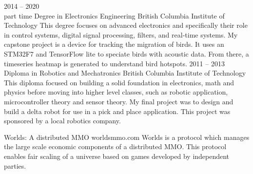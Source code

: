 \documentclass[9pt]{developercv} %
\begin{document}
\begin{entrylist}
	\entry
		{2014 -- 2020\\ \footnotesize{part time}}
		{Degree in Electronics Engineering}
		{British Columbia Institute of Technology}
		{This degree focuses on advanced electronics and specifically their role in control systems, digital signal processing, filters, and real-time systems. My capstone project is a device for tracking the migration of birds. It uses an STM32F7 and TensorFlow lite to speciate birds with acoustic data. From there, a timeseries heatmap is generated to understand bird hotspots.}
	\entry
		{2011 -- 2013}
		{Diploma in Robotics and Mechatronics}
		{British Columbia Institute of Technology}
		{This diploma focused on building a solid foundation in electronics, math and physics before moving into higher level classes, such as robotic application, microcontroller theory and sensor theory. My final project was to design and build a delta robot for use in a pick and place application. This project was sponsored by a local robotics company.}
\end{entrylist}



\begin{entrylist}
	\entry
		{}
		{Worlds: A distributed MMO}
		{worldsmmo.com}
		{Worlds is a protocol which manages the large scale economic components of a distributed MMO. This protocol enables fair scaling of a universe based on games developed by independent parties.}

\end{entrylist}
\end{document}
